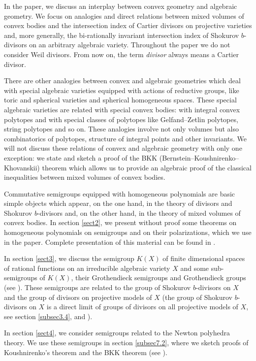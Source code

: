\documentclass[11pt]{article}
\theoremstyle{plain}
\theoremstyle{definition}
\begin{document}
In the paper, we discuss an interplay between convex geometry  and algebraic geometry. We  focus on analogies and direct relations between
mixed volumes of convex bodies and the  intersection index of Cartier divisors on  projective  varieties and,  more generally, the  bi-rationally invariant intersection index  of Shokurov $b$-divisors on an arbitrary algebraic variety. Throughout the paper we do not consider Weil divisors. From now on, the term {\it divisor} always means a Cartier divisor.

There are  other analogies  between convex and algebraic geometries which deal with special algebraic   varieties equipped with  actions of reductive groups, like toric and spherical varieties and spherical homogeneous spaces. These special algebraic varieties are related with special convex bodies: with integral convex polytopes  and with special classes of polytopes  like Gelfand--Zetlin polytopes, string  polytopes and so on. These analogies involve not only volumes but also combinatorics of polytopes, structure of integral  points and other invariants. We will not discuss  these relations of convex   and algebraic  geometry with only one exception: we state and sketch a proof of the BKK (Bernstein--Koushnirenko--Khovanskii) theorem which allows us to provide an algebraic proof of the classical inequalities between mixed volumes of convex bodies.

Commutative semigroups equipped with  homogeneous polynomials are basic simple objects which appear, on the one hand,  in the theory of
divisors and  Shokurov $b$-divisors and, on the other hand,  in the theory of mixed volumes of convex bodies. In section \ref{sect2},  we present  without  proof some   theorems on homogeneous polynomials on semigroups and on their polarizations, which we use in the paper.  Complete presentation of this material can be found in \cite{Kh25}.

In section \ref{sect3},  we discuss the semigroup $K(X)$ of finite dimensional spaces of rational functions on an irreducible algebraic variety $X$ and
some sub-semigroups of $K(X)$, their Grothendieck semigroups and Grothendieck groups (see  \cite{K-K10}). These semigroups  are related to the group of Shokurov $b$-divisors on $X$ and the group of  divisors on projective  models   of $X$ (the group of Shokurov $b$-divisors on $X$
is a direct limit of groups of  divisors on all projective models of $X$, see section \ref{subsec3.4},  \cite{Isk03} and  \cite{K-K14}).

In section  \ref{sect4}, we consider semigroups related to the Newton polyhedra theory. We use these semigroups in section \ref{subsec7.2}, where we
sketch  proofs of Koushnirenko's theorem and the BKK theorem (see  \cite{Kh92}).
\end{document}
